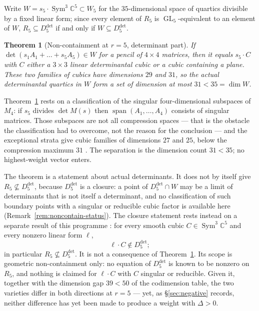 \documentclass[11pt]{amsart}
\theoremstyle{plain}
\newtheorem{theorem}{Theorem}[section]
\theoremstyle{definition}
\theoremstyle{remark}
\DeclareMathOperator{\GL}{GL}
\DeclareMathOperator{\Sym}{Sym}
\newcommand{\bC}{\mathbb{C}}
\newcommand{\Rr}{R}
\newcommand{\Ddet}{D^{\det}}
\begin{document}
Write $W=s_5\cdot\Sym^{3}\bC^{5}\subset W_5$ for the $35$-dimensional space of
quartics divisible by a fixed linear form; since every element of $\Rr_5$ is
$\GL_5$-equivalent to an element of $W$, $\Rr_5\subseteq\Ddet_5$ if and only if
$W\subseteq\Ddet_5$.

\begin{theorem}[Non-containment at $r=5$, determinant part]\label{thm:noncontain}
If $\det(s_1A_1+\dots+s_5A_5)\in W$ for a pencil of $4\times4$ matrices, then
it equals $s_5\cdot C$ with $C$ either a $3\times3$ linear determinantal cubic
or a cubic containing a plane.  These two families of cubics have dimensions
$29$ and $31$, so the actual determinantal quartics in $W$ form a set of
dimension at most $31<35=\dim W$.
\end{theorem}

Theorem~\ref{thm:noncontain} rests on a classification of the singular
four-dimensional subspaces of $M_4$: if $s_5$ divides $\det M(s)$ then
$\operatorname{span}(A_1,\dots,A_4)$ consists of singular matrices.  Those
subspaces are not all compression spaces --- that is the obstacle the
classification had to overcome, not the reason for the conclusion --- and the
exceptional strata give cubic families of dimensions $27$ and $25$, below the
compression maximum $31$ \cite{Companion2}.  The separation is the dimension
count $31<35$; no highest-weight vector enters.

The theorem is a statement about actual determinants.  It does not by itself
give $\Rr_5\not\subseteq\Ddet_5$, because $\Ddet_5$ is a closure: a point of
$\Ddet_5\cap W$ may be a limit of determinants that is not itself a
determinant, and no classification of such boundary points with a singular or
reducible cubic factor is available here (Remark~\ref{rem:noncontain-status}).
The closure statement rests instead on a separate result of this programme
\cite{Companion2}: for every smooth cubic $C\in\Sym^{3}\bC^{5}$ and every
nonzero linear form $\ell$,
\[
  \ell\cdot C\notin\Ddet_5 ;
\]
in particular $\Rr_5\not\subseteq\Ddet_5$.  It is not a consequence of
Theorem~\ref{thm:noncontain}.  Its scope is geometric non-containment only: no
equation of $\Ddet_5$ is known to be nonzero on $\Rr_5$, and nothing is claimed
for $\ell\cdot C$ with $C$ singular or reducible.  Given it, together with the
dimension gap $39<50$ of the codimension table, the two varieties differ in
both directions at $r=5$ --- yet, as \S\ref{sec:negative} records, neither
difference has yet been made to produce a weight with $\Delta>0$.
\end{document}

